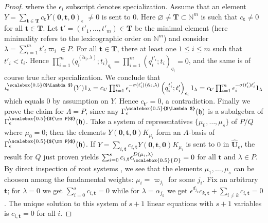\documentclass[11pt]{amsart}
\newcommand{\e}{\epsilon}
\newcommand{\eD}{\epsilon_{\scalebox{0.5}{D}}}
\newcommand{\Pup}{{\scalebox{0.5}{${\rm P}$}}}
\newcommand{\Lam}{{\scalebox{0.5}{$\Lambda$}}}
\begin{document}
\begin{proof}
where the $\epsilon_i$ subscript denotes specialization. Assume that an element $\textstyle Y = \sum_{\mathbf{t} \in \mathbf{T}} c_{\mathbf{t}} Y(\mathbf{0},\mathbf{t},\mathbf{0})_{\epsilon}$ $\neq 0$ is sent to $0$. Here $\varnothing \neq \mathbf{T} \subset \mathbb{N}^m$ is such that $c_{\mathbf{t}} \neq 0$ for all $\mathbf{t} \in \mathbf{T}$. Let $\mathbf{t}' = (t'_1, \ldots, t'_m) \in \mathbf{T}$ be the minimal element (here minimality refers to the lexicographic order on $\mathbb{N}^m$) and consider $\textstyle \lambda = \sum_{i=1}^m t'_i\varpi_i \in P$. For all $\mathbf{t} \in \mathbf{T}$, there at least one $1 \leq i \leq m$ such that $t'_i < t_i$. Hence $\textstyle \prod_{i=1}^m\bigl(q_i^{(\check{\alpha}_i,\lambda)}; t_i\bigr)_{q_i} = \prod_{i=1}^m\left(q_i^{t'_i}; t_i\right)_{q_i} = 0$, and the same is of course true after specialization. We conclude that $\textstyle \iota_\e^\Lam(Y)1_\lambda = c_{\mathbf{t}'}\prod_{i=1}^m \epsilon^{-\sigma(t'_i)(\check{\alpha}_i,\lambda)}_i\left(q_i^{t'_i}; t'_i\right)_{\epsilon_i}1_\lambda =  c_{\mathbf{t}'}\prod_{i=1}^m \epsilon^{-\sigma(t'_i)t'_i}_i1_\lambda $ which equals $0$ by assumption on $Y$. Hence $c_{\mathbf{t}'} = 0$, a contradiction. Finally we prove the claim for $\Lambda = P$, since any $\Gamma^\Lam_{\epsilon}(\mathfrak{h})$ is a subalgebra of $\Gamma^\Pup_{\epsilon}(\mathfrak{h})$. Take a system of representatives $\{ \mu_0, \ldots, \mu_s \}$ of $P/Q$ where $\mu_0 = 0$; then the elements $Y(\mathbf{0},\mathbf{t},\mathbf{0})K_{\mu_i}$ form an $A$-basis of $\Gamma^\Pup_{\epsilon}(\mathfrak{h})$. If $\textstyle Y = \sum_{i,\mathbf{t}} c_{i,\mathbf{t}} Y(\mathbf{0},\mathbf{t},\mathbf{0})K_{\mu_i}$ is sent to $0$ in $\hat{\mathbf{U}}_\e$, the result for $Q$ just proven yields $\textstyle \sum_{i=0}^s c_{i,\mathbf{t}}\eD^{D(\mu_i,\lambda)} = 0$ for all $\mathbf{t}$ and $\lambda \in P$. By direct inspection of root systems \cite[Chap.\,6]{Bourbaki}, we see that the elements $\mu_1,\ldots,\mu_s$ can be choosen among the fundamental weights: $\mu_i = \varpi_{j_i}$ for some $j_i$. Fix an arbitrary $\mathbf{t}$; for $\lambda = 0$ we get $\textstyle \sum_{i=0}^s c_{i,\mathbf{t}} = 0$ while for $\lambda = \alpha_{j_k}$ we get $\textstyle \e^{d_{j_k}}c_{k,\mathbf{t}} + \sum_{i\neq k}c_{i,\mathbf{t}} = 0$. The unique solution to this system of $s+1$ linear equations with $s+1$ variables is $c_{i,\mathbf{t}} = 0$ for all $i$.
\end{proof}
\end{document}
